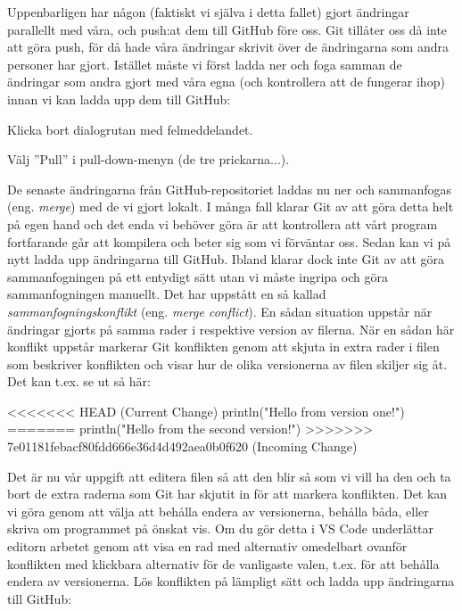 \begin{Datorarbete}
	Uppenbarligen har någon (faktiskt vi själva i detta fallet) gjort ändringar parallellt med våra, och push:at dem till GitHub före oss. Git tillåter oss då inte att göra push, för då hade våra ändringar skrivit över de ändringarna som andra personer har gjort.	Istället måste vi först ladda ner och foga samman de ändringar som andra gjort med våra egna (och kontrollera att de fungerar ihop) innan vi kan ladda upp dem till GitHub:

	\begin{Deluppgifter}
		\item Klicka bort dialogrutan med felmeddelandet.
		\item Välj ''Pull'' i pull-down-menyn (de tre prickarna...).
	\end{Deluppgifter}

	De senaste ändringarna från GitHub-repositoriet laddas nu ner och sammanfogas (eng. \emph{merge}) med de vi gjort lokalt. I många fall klarar Git av att göra detta helt på egen hand och det enda vi behöver göra är att kontrollera att vårt program fortfarande går att kompilera och beter sig som vi förväntar oss. Sedan kan vi på nytt ladda upp ändringarna till GitHub. Ibland  klarar dock inte Git av att göra sammanfogningen på ett entydigt sätt utan vi måste ingripa och göra sammanfogningen manuellt. Det har uppstått en så kallad \emph{sammanfogningskonflikt} (eng. \emph{merge conflict}). En sådan situation uppstår när ändringar gjorts på samma rader i respektive version av filerna. När en sådan här konflikt uppstår markerar Git konflikten genom att skjuta in extra rader i filen som beskriver konflikten och visar hur de olika versionerna av filen skiljer sig åt. Det kan t.ex. se ut så här:

	\begin{Code}
		<<<<<<< HEAD (Current Change)
		println("Hello from version one!")
		=======
		println("Hello from the second version!")
		>>>>>>> 7e01181febacf80fdd666e36d4d492aea0b0f620 (Incoming Change)
	\end{Code}

	Det är nu vår uppgift att editera filen så att den blir så som vi vill ha den och ta bort de extra raderna som Git har skjutit in för att markera konflikten. Det kan vi göra genom att välja att behålla endera av versionerna, behålla båda, eller skriva om programmet på önskat vis. Om du gör detta i VS Code underlättar editorn arbetet genom att visa en rad med alternativ omedelbart ovanför konflikten med klickbara alternativ för de vanligaste valen, t.ex. för att behålla endera av versionerna. Lös konflikten på lämpligt sätt och ladda upp ändringarna till GitHub:


\end{Datorarbete}
